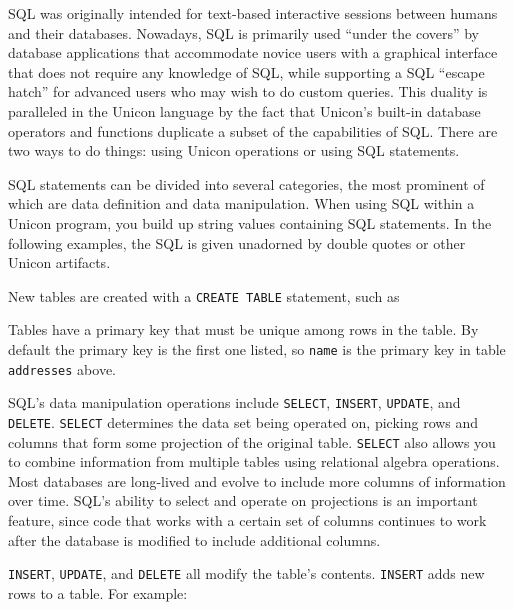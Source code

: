 SQL was originally intended for text-based interactive sessions between
humans and their databases. Nowadays, SQL is primarily used
``under the covers'' by database
applications that accommodate novice users with
a graphical interface that does not require any knowledge of SQL, while
supporting a SQL ``escape hatch'' for
advanced users who may wish to do custom queries. This duality is
paralleled in the Unicon language by the fact that
Unicon's built-in database operators and functions
duplicate a subset of the capabilities of SQL. There are two ways to do
things: using Unicon operations or using SQL statements.

SQL statements can be divided into several categories, the most
prominent of which are data definition and data manipulation. When
using SQL within a Unicon program, you build up string values
containing SQL statements. In the following examples, the SQL is given
unadorned by double quotes or other Unicon artifacts.

New tables are created with a \texttt{CREATE TABLE} statement, such as


Tables have a primary key that must be unique among rows in the table.
By default the primary key is the first one listed, so \texttt{name} is
the primary key in table \texttt{addresses} above.

SQL's data manipulation operations include
\texttt{SELECT}, \texttt{INSERT}, \texttt{UPDATE}, and \texttt{DELETE}.
\texttt{SELECT} determines the data set being operated on,
picking rows and columns that form some projection of the original
table. \texttt{SELECT} also allows you to combine
information from multiple tables using relational algebra operations.
Most databases are long-lived and evolve to include more columns of
information over time. SQL's ability to select and
operate on projections is an important feature, since code that works
with a certain set of columns continues to work after the database is
modified to include additional columns.

\texttt{INSERT}, \texttt{UPDATE}, and \texttt{DELETE} all modify the
table's contents. \texttt{INSERT} adds new rows to a
table. For example:


